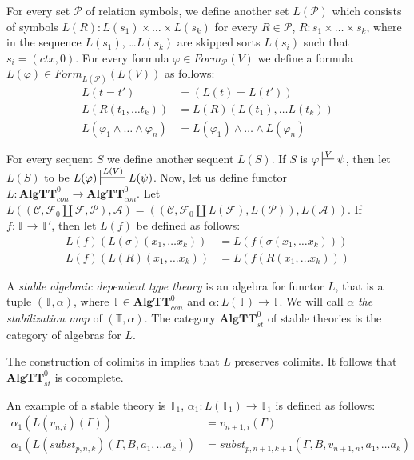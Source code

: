 \documentclass[reqno]{amsart}
\theoremstyle{definition}
\theoremstyle{remark}
\newcommand{\cat}[1]{\mathbf{#1}}
\newcommand{\algtt}{\cat{AlgTT}}
\numberwithin{figure}{section}
\begin{document}
For every set $\mathcal{P}$ of relation symbols, we define another set $L(\mathcal{P})$ which consists of symbols
    $L(R) : L(s_1) \times \ldots \times L(s_k)$ for every $R \in \mathcal{P}$, $R : s_1 \times \ldots \times s_k$,
    where in the sequence $L(s_1)$, \ldots $L(s_k)$ are skipped sorts $L(s_i)$ such that $s_i = (ctx,0)$.
For every formula $\varphi \in Form_\mathcal{P}(V)$ we define a formula $L(\varphi) \in Form_{L(\mathcal{P})}(L(V))$ as follows:
\begin{align*}
L(t = t') & = (L(t) = L(t')) \\
L(R(t_1, \ldots t_k)) & = L(R)(L(t_1), \ldots L(t_k)) \\
L(\varphi_1 \land \ldots \land \varphi_n) & = L(\varphi_1) \land \ldots \land L(\varphi_n)
\end{align*}

For every sequent $S$ we define another sequent $L(S)$.
If $S$ is $\varphi \sststile{}{V} \psi$, then let $L(S)$ to be $L(\varphi) \sststile{}{L(V)} L(\psi)$.
Now, let us define functor $L : \algtt^0_{con} \to \algtt^0_{con}$.
Let $L((\mathcal{C}, \mathcal{F}_0 \amalg \mathcal{F}, \mathcal{P}), \mathcal{A}) = ((\mathcal{C}, \mathcal{F}_0 \amalg L(\mathcal{F}), L(\mathcal{P})), L(\mathcal{A}))$.
If $f : \mathbb{T} \to \mathbb{T}'$, then let $L(f)$ be defined as follows:
\begin{align*}
L(f)(L(\sigma)(x_1, \ldots x_k)) & = L(f(\sigma(x_1, \ldots x_k))) \\
L(f)(L(R)(x_1, \ldots x_k)) & = L(f(R(x_1, \ldots x_k)))
\end{align*}

\begin{defn}
A \emph{stable algebraic dependent type theory} is an algebra for functor $L$,
    that is a tuple $(\mathbb{T},\alpha)$, where $\mathbb{T} \in \algtt^0_{con}$ and $\alpha : L(\mathbb{T}) \to \mathbb{T}$.
We will call $\alpha$ \emph{the stabilization map} of $(\mathbb{T},\alpha)$.
The category $\algtt^0_{st}$ of stable theories is the category of algebras for $L$.
\end{defn}

The construction of colimits in  implies that $L$ preserves colimits.
It follows that $\algtt^0_{st}$ is cocomplete.

An example of a stable theory is $\mathbb{T}_1$, $\alpha_1 : L(\mathbb{T}_1) \to \mathbb{T}_1$ is defined as follows:
\begin{align*}
\alpha_1(L(v_{n,i})(\Gamma)) & = v_{n+1,i}(\Gamma) \\
\alpha_1(L(subst_{p,n,k})(\Gamma, B, a_1, \ldots a_k)) & = subst_{p,n+1,k+1}(\Gamma, B, v_{n+1,n}, a_1, \ldots a_k)
\end{align*}
\end{document}
